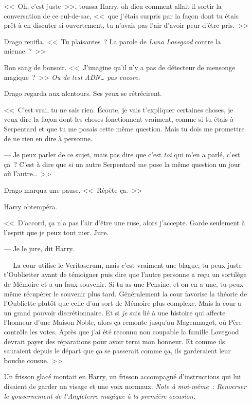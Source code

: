 <<~Oh, c'est juste~>>, toussa Harry, oh dieu comment allait il sortir la conversation de ce cul-de-sac, <<~que j'étais surpris par la façon dont tu étais prêt à en discuter si ouvertement, tu n'avais pas l'air d'avoir peur d'être pris.~>>

Drago renifla. <<~Tu plaisantes~? La parole de \emph{Luna Lovegood} contre la mienne~?~>>

Bon sang de bonsoir. <<~J'imagine qu'il n'y a pas de détecteur de mensonge magique~?~>> \emph{Ou de test ADN… pas encore.}

Drago regarda aux alentours. Ses yeux se rétrécirent.

<<~C'est vrai, tu ne sais rien. Écoute, je vais t'expliquer certaines choses, je veux dire la façon dont les choses fonctionnent vraiment, comme si tu étais à Serpentard et que tu me posais cette même question. Mais tu dois me promettre de ne rien en dire à personne.

--- Je peux parler de ce sujet, mais pas dire que c'est \emph{toi} qui m'en a parlé, c'est ça~? C'est à dire que si un autre Serpentard me pose la même question un jour où l'autre…~>>

Drago marqua une pause. <<~Répète ça.~>>

Harry obtempéra.

<<~D'accord, ça n'a pas l'air d'être une ruse, alors j'accepte. Garde seulement à l'esprit que je peux tout nier. Jure.

--- Je le jure, dit Harry.

--- La cour utilise le Veritaserum, mais c'est vraiment une blague, tu peux juste t'Oublietter avant de témoigner puis dire que l'autre personne a reçu un sortilège de Mémoire et a un faux souvenir. Si tu as une Pensine, et on en a une, tu peux même récupérer le souvenir plus tard. Généralement la cour favorise la théorie de l'Oubliette plutôt que celle d'un sort de Mémoire plus complexe. Mais la cour a un grand pouvoir discrétionnaire. Et si \emph{je} suis lié à une histoire qui affecte l'honneur d'une Maison Noble, alors ça remonte jusqu'au Magenmagot, où Père contrôle les votes. Après que j'ai été reconnu non coupable la famille Lovegood devrait payer des réparations pour avoir terni mon honneur. Et comme ils sauraient depuis le départ que ça se passerait comme ça, ils garderaient leur bouche cousue.~>>

Un frisson glacé montait en Harry, un frisson accompagné d'instructions qui lui disaient de garder un visage et une voix normaux. \emph{Note à moi-même~: Renverser le gouvernement de l'Angleterre magique à la première occasion.}

